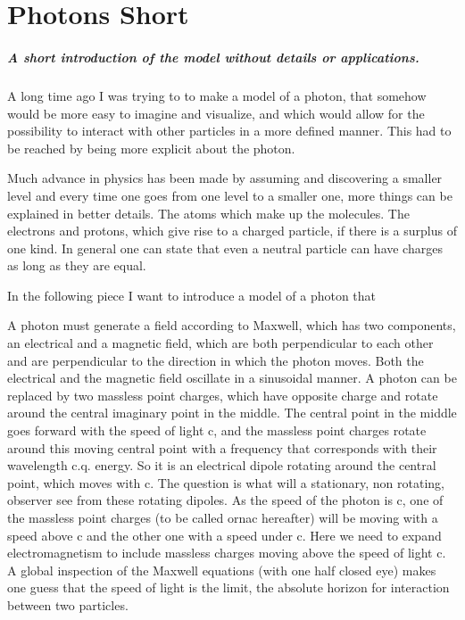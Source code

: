 \chapter{Photons Short}

\paragraph{
A short introduction of the model without details or applications.}

\paragraph{}
A long time ago I was trying to to make a model of a photon, that somehow would be more easy to imagine and visualize,  and which would allow for the possibility to interact with other particles in a more defined manner. This had to be reached by being more explicit about the photon.

Much advance in physics has been made by assuming and discovering a smaller level and every time one goes from one level to a smaller one, more things can be explained in better details. The atoms which make up the molecules. The electrons and protons, which give rise to a charged particle, if there is a surplus of one kind. In general one can state that even a neutral particle can have charges as long as they are equal.


In the following piece I want to introduce a model of a photon that

A photon must generate a field according to Maxwell, which has two components, an electrical and a magnetic field, which are both perpendicular to each other and are perpendicular to the direction in which the photon moves. Both the electrical and the magnetic field oscillate in a sinusoidal manner.
A photon can be replaced by two massless point charges, which have opposite charge and rotate around the central imaginary point in the middle. The central point in the middle goes forward with the speed of light c, and the massless point charges rotate around this moving central point with a frequency that corresponds with their wavelength c.q. energy.
So it is an electrical dipole rotating around the central point, which moves with c.
The question is what will a stationary, non rotating, observer see from these rotating dipoles. As the speed of the photon is c, one of the massless point charges (to be called ornac hereafter) will be moving with a speed above c and the other one with a speed under c.
Here we need to expand electromagnetism to include massless charges moving above the speed of light c. A global inspection of the Maxwell equations (with one half closed eye) makes one guess that the speed of light is the limit, the absolute horizon for interaction between two particles. 


